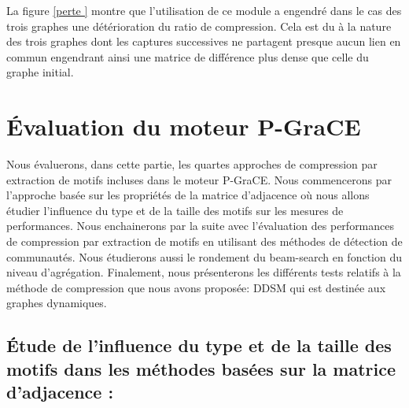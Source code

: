 La figure \ref{perte } montre que l'utilisation de ce module a engendré dans le cas des trois graphes une détérioration du ratio de compression. Cela est du à la nature des trois graphes dont les captures successives ne partagent presque aucun lien en commun engendrant ainsi une matrice de différence plus dense que  celle du graphe initial.



	\section{Évaluation du moteur P-GraCE}
	
	Nous évaluerons, dans cette partie, les quartes approches de compression par extraction de motifs incluses dans le moteur P-GraCE. Nous commencerons par l'approche basée sur les propriétés de la matrice d'adjacence où nous allons étudier l'influence du type et de la taille des motifs sur les mesures de performances.  Nous enchainerons par la suite avec l'évaluation des performances de compression par extraction de motifs en utilisant des méthodes de détection de communautés. Nous étudierons aussi le rondement du beam-search en fonction du niveau d'agrégation. Finalement, nous présenterons les différents tests relatifs à la méthode de compression que nous avons proposée: DDSM qui est destinée aux graphes dynamiques.
	
	\subsection{Étude de l'influence du type et de la taille des motifs dans les méthodes basées sur la matrice d'adjacence :}
	
